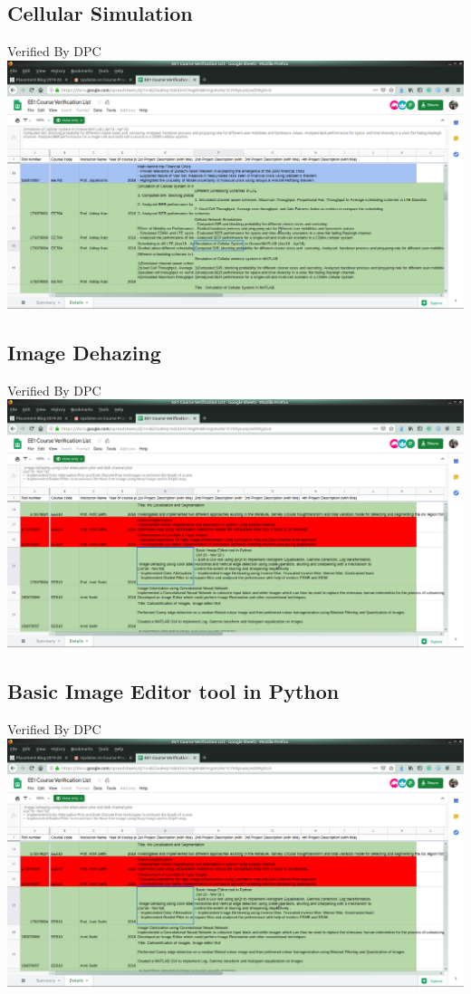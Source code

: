 \documentclass{article}
\begin{document}
	\subsection{Cellular Simulation}
		Verified By DPC\\
		\includegraphics[page=1, scale=0.25]{proofs/wireless.png}
	\subsection{Image Dehazing}
		Verified By DPC\\
		\includegraphics[page=1, scale=0.25]{proofs/image_processing.png}
	\subsection{Basic Image Editor tool in Python}
		Verified By DPC\\
		\includegraphics[page=1, scale=0.25]{proofs/image_processing.png}
\end{document}
